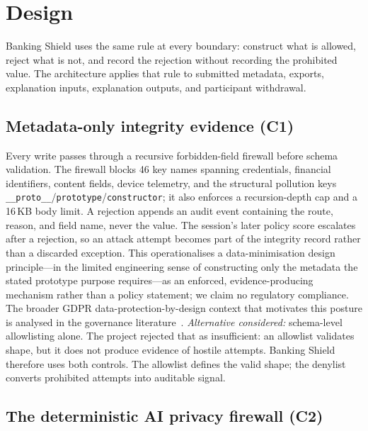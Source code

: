 \documentclass[conference]{IEEEtran}
\newcommand{\sys}{Banking Shield}
\begin{document}
\section{Design}

\sys{} uses the same rule at every boundary: construct what is allowed, reject
what is not, and record the rejection without recording the prohibited value.
The architecture applies that rule to submitted metadata, exports, explanation
inputs, explanation outputs, and participant withdrawal.

\subsection{Metadata-only integrity evidence (C1)}
\label{sec:c1}

Every write passes through a recursive forbidden-field firewall before schema
validation. The firewall blocks 46 key names spanning credentials, financial
identifiers, content fields, device telemetry, and the structural pollution keys
\texttt{\_\_proto\_\_}/\texttt{prototype}/\texttt{constructor}; it also enforces
a recursion-depth cap and a 16\,KB body limit. A rejection appends an audit
event containing the route, reason, and field name, never the value. The
session's later policy score escalates after a rejection, so an attack attempt
becomes part of the integrity record rather than a discarded exception. This
operationalises a data-minimisation design principle---in the limited
engineering sense of constructing only the metadata the stated prototype purpose
requires---as an enforced, evidence-producing mechanism rather than a policy
statement; we claim no regulatory compliance. The broader GDPR
data-protection-by-design context that motivates this posture is analysed in the
governance literature~\cite{klein2022pond,yeung2022demystifying}.
\emph{Alternative considered:} schema-level
allowlisting alone. The project rejected that as insufficient: an allowlist
validates shape, but it does not produce evidence of hostile attempts. \sys{}
therefore uses both controls. The allowlist defines the valid shape; the
denylist converts prohibited attempts into auditable signal.

\subsection{The deterministic AI privacy firewall (C2)}
\label{sec:c2}
\end{document}
